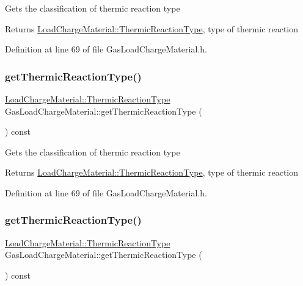 Gets the classification of thermic reaction type \begin{DoxyReturn}{Returns}
\hyperlink{namespace_load_charge_material_a51d4263e865a5d86236622dd3fe23fd1}{Load\+Charge\+Material\+::\+Thermic\+Reaction\+Type}, type of thermic reaction 
\end{DoxyReturn}


Definition at line 69 of file Gas\+Load\+Charge\+Material.\+h.

\mbox{\label{class_gas_load_charge_material_ac801f30ccf58ce98fdb6b8cdb0a9767f}} 
\subsubsection{\texorpdfstring{get\+Thermic\+Reaction\+Type()}{getThermicReactionType()}\hspace{0.1cm}{\footnotesize\ttfamily [2/3]}}
{\footnotesize\ttfamily \hyperlink{namespace_load_charge_material_a51d4263e865a5d86236622dd3fe23fd1}{Load\+Charge\+Material\+::\+Thermic\+Reaction\+Type} Gas\+Load\+Charge\+Material\+::get\+Thermic\+Reaction\+Type (\begin{DoxyParamCaption}{ }\end{DoxyParamCaption}) const\hspace{0.3cm}{\ttfamily [inline]}}

Gets the classification of thermic reaction type \begin{DoxyReturn}{Returns}
\hyperlink{namespace_load_charge_material_a51d4263e865a5d86236622dd3fe23fd1}{Load\+Charge\+Material\+::\+Thermic\+Reaction\+Type}, type of thermic reaction 
\end{DoxyReturn}


Definition at line 69 of file Gas\+Load\+Charge\+Material.\+h.

\mbox{\label{class_gas_load_charge_material_ac801f30ccf58ce98fdb6b8cdb0a9767f}} 
\subsubsection{\texorpdfstring{get\+Thermic\+Reaction\+Type()}{getThermicReactionType()}\hspace{0.1cm}{\footnotesize\ttfamily [3/3]}}
{\footnotesize\ttfamily \hyperlink{namespace_load_charge_material_a51d4263e865a5d86236622dd3fe23fd1}{Load\+Charge\+Material\+::\+Thermic\+Reaction\+Type} Gas\+Load\+Charge\+Material\+::get\+Thermic\+Reaction\+Type (\begin{DoxyParamCaption}{ }\end{DoxyParamCaption}) const\hspace{0.3cm}{\ttfamily [inline]}}

